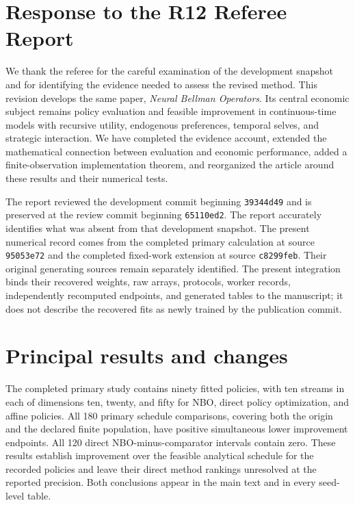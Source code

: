 \section*{Response to the R12 Referee Report}

We thank the referee for the careful examination of the development snapshot and for identifying the evidence needed to assess the revised method. This revision develops the same paper, \emph{Neural Bellman Operators}. Its central economic subject remains policy evaluation and feasible improvement in continuous-time models with recursive utility, endogenous preferences, temporal selves, and strategic interaction. We have completed the evidence account, extended the mathematical connection between evaluation and economic performance, added a finite-observation implementation theorem, and reorganized the article around these results and their numerical tests.

The report reviewed the development commit beginning \texttt{39344d49} and is preserved at the review commit beginning \texttt{65110ed2}. The report accurately identifies what was absent from that development snapshot. The present numerical record comes from the completed primary calculation at source \texttt{95053e72} and the completed fixed-work extension at source \texttt{c8299feb}. Their original generating sources remain separately identified. The present integration binds their recovered weights, raw arrays, protocols, worker records, independently recomputed endpoints, and generated tables to the manuscript; it does not describe the recovered fits as newly trained by the publication commit.

\section*{Principal results and changes}

The completed primary study contains ninety fitted policies, with ten streams in each of dimensions ten, twenty, and fifty for NBO, direct policy optimization, and affine policies. All 180 primary schedule comparisons, covering both the origin and the declared finite population, have positive simultaneous lower improvement endpoints. All 120 direct NBO-minus-comparator intervals contain zero. These results establish improvement over the feasible analytical schedule for the recorded policies and leave their direct method rankings unresolved at the reported precision. Both conclusions appear in the main text and in every seed-level table.

